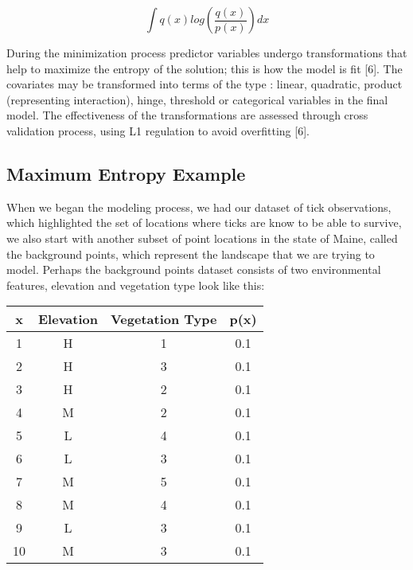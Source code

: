 \begin{equation}
\int q(x)log(\frac{q(x)}{p(x)}) dx
\end{equation}


\noindent  During the minimization process predictor variables undergo transformations that help to maximize the entropy of the solution; this is how the model is fit [6]. The covariates may be transformed into terms of the type : linear, quadratic, product (representing interaction), hinge, threshold or categorical variables in the final model. The effectiveness of the transformations are assessed through cross validation process, using L1 regulation to avoid overfitting [6].  \newline


\subsection{Maximum Entropy Example}

\noindent When we began the modeling process, we had our dataset of tick observations, which highlighted the set of locations where ticks are know to be able to survive, we also start with another subset of point locations in the state of Maine, called the background points, which represent the landscape that we are trying to model. Perhaps the background points dataset consists of two environmental features, elevation and vegetation type look like this: 

\begin{center}
 \begin{tabular}{||c c c c||} 
 \hline
 x & Elevation & Vegetation Type & p(x) \\ [0.5ex] 
 \hline\hline
 1 & H &  1& 0.1  \\ 
 \hline
  2 & H & 3 & 0.1\\
 \hline
   3 & H & 2 & 0.1\\
 \hline
 4 & M & 2 & 0.1  \\
 \hline
  5 & L & 4 & 0.1 \\
 \hline
   6 & L & 3 & 0.1\\
 \hline
  7 & M & 5 & 0.1 \\
 \hline
   8 & M & 4 & 0.1\\
 \hline
 9 & L & 3 & 0.1 \\
 \hline
   10 & M & 3 & 0.1\\
 \hline
\end{tabular}
\end{center}


